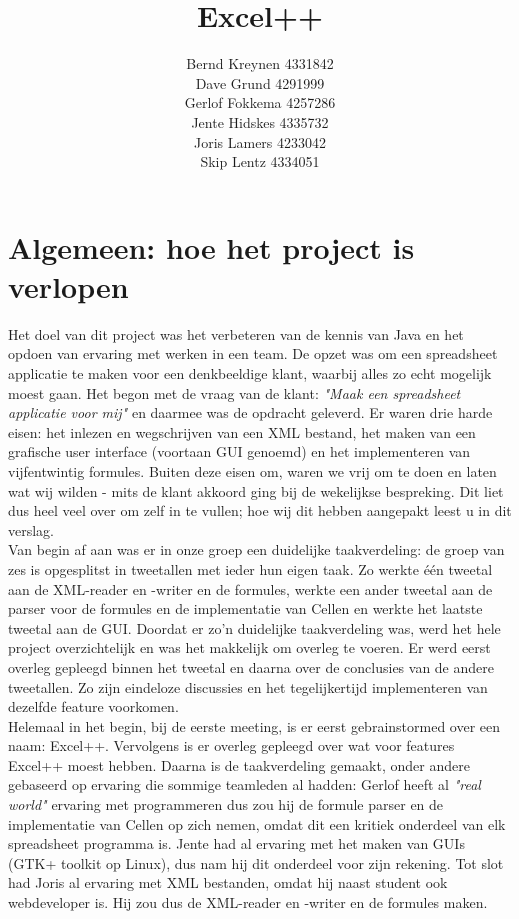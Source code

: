 \documentclass[a4paper,11pt]{article}
\title{Excel++}
\author{Bernd Kreynen 4331842\\
		Dave Grund 4291999\\
		Gerlof Fokkema 4257286\\
		Jente Hidskes 4335732\\
		Joris Lamers 4233042\\
		Skip Lentz 4334051\\
	   }
\begin{document}
\begin{titlepage}
\maketitle
\thispagestyle{empty} %
\end{titlepage}

\setcounter{tocdepth}{2}
\tableofcontents

\newpage\section{Algemeen: hoe het project is verlopen}
Het doel van dit project was het verbeteren van de kennis van Java en het opdoen van ervaring met werken in een team. De opzet was om een spreadsheet applicatie te maken voor een denkbeeldige klant, waarbij alles zo echt mogelijk moest gaan. Het begon met de vraag van de klant: \textit{"Maak een spreadsheet applicatie voor mij"} en daarmee was de opdracht geleverd. Er waren drie harde eisen: het inlezen en wegschrijven van een XML bestand, het maken van een grafische user interface (voortaan GUI genoemd) en het implementeren van vijfentwintig formules. Buiten deze eisen om, waren we vrij om te doen en laten wat wij wilden - mits de klant akkoord ging bij de wekelijkse bespreking. Dit liet dus heel veel over om zelf in te vullen; hoe wij dit hebben aangepakt leest u in dit verslag.\\

Van begin af aan was er in onze groep een duidelijke taakverdeling: de groep van zes is opgesplitst in tweetallen met ieder hun eigen taak. Zo werkte één tweetal aan de XML-reader en -writer en de formules, werkte een ander tweetal aan de parser voor de formules en de implementatie van Cellen en werkte het laatste tweetal aan de GUI. Doordat er zo’n duidelijke taakverdeling was, werd het hele project overzichtelijk en was het makkelijk om overleg te voeren. Er werd eerst overleg gepleegd binnen het tweetal en daarna over de conclusies van de andere tweetallen. Zo zijn eindeloze discussies en het tegelijkertijd implementeren van dezelfde feature voorkomen.\\

Helemaal in het begin, bij de eerste meeting, is er eerst gebrainstormed over een naam: Excel++. Vervolgens is er overleg gepleegd over wat voor features Excel++ moest hebben. Daarna is de taakverdeling gemaakt, onder andere gebaseerd op ervaring die sommige teamleden al hadden: Gerlof heeft al \textit{"real world"} ervaring met programmeren dus zou hij de formule parser en de implementatie van Cellen op zich nemen, omdat dit een kritiek onderdeel van elk spreadsheet programma is. Jente had al ervaring met het maken van GUIs (GTK+ toolkit op Linux), dus nam hij dit onderdeel voor zijn rekening. Tot slot had Joris al ervaring met XML bestanden, omdat hij naast student ook webdeveloper is. Hij zou dus de XML-reader en -writer en de formules maken.
\end{document}
